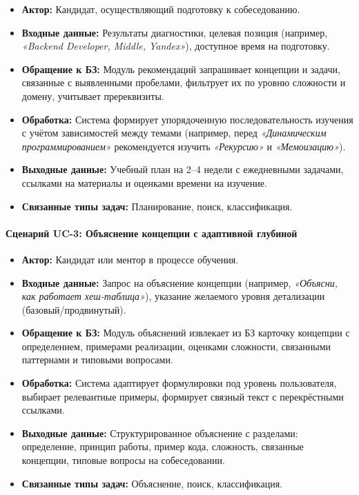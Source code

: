 \begin{itemize}
    \item \textbf{Актор:} Кандидат, осуществляющий подготовку к собеседованию.
    \item \textbf{Входные данные:} Результаты диагностики, целевая позиция (например, \textit{«Backend Developer, Middle, Yandex»}), доступное время на подготовку.
    \item \textbf{Обращение к БЗ:} Модуль рекомендаций запрашивает концепции и задачи, связанные с выявленными пробелами, фильтрует их по уровню сложности и домену, учитывает пререквизиты.
    \item \textbf{Обработка:} Система формирует упорядоченную последовательность изучения с учётом зависимостей между темами (например, перед \textit{«Динамическим программированием»} рекомендуется изучить \textit{«Рекурсию»} и \textit{«Мемоизацию»}).
    \item \textbf{Выходные данные:} Учебный план на 2–4 недели с ежедневными задачами, ссылками на материалы и оценками времени на изучение.
    \item \textbf{Связанные типы задач:} Планирование, поиск, классификация.
\end{itemize}

\paragraph{Сценарий UC-3: Объяснение концепции с адаптивной глубиной}

\begin{itemize}
    \item \textbf{Актор:} Кандидат или ментор в процессе обучения.
    \item \textbf{Входные данные:} Запрос на объяснение концепции (например, \textit{«Объясни, как работает хеш-таблица»}), указание желаемого уровня детализации (базовый/продвинутый).
    \item \textbf{Обращение к БЗ:} Модуль объяснений извлекает из БЗ карточку концепции с определением, примерами реализации, оценками сложности, связанными паттернами и типовыми вопросами.
    \item \textbf{Обработка:} Система адаптирует формулировки под уровень пользователя, выбирает релевантные примеры, формирует связный текст с перекрёстными ссылками.
    \item \textbf{Выходные данные:} Структурированное объяснение с разделами: определение, принцип работы, пример кода, сложность, связанные концепции, типовые вопросы на собеседовании.
    \item \textbf{Связанные типы задач:} Объяснение, поиск, классификация.
\end{itemize}


